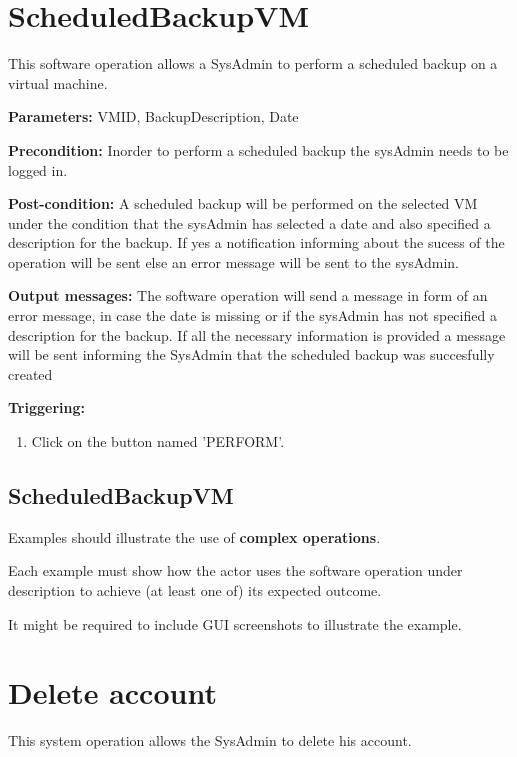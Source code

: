 \section{ScheduledBackupVM}
\label{operation:ScheduledBackupVM}
This software operation allows a SysAdmin to perform a scheduled backup on a
virtual machine.
\begin{description}

\item \textbf{Parameters:} VMID, BackupDescription, Date
\item \textbf{Precondition:} Inorder to perform a scheduled backup the sysAdmin 
needs to be logged in.
\item \textbf{Post-condition:} A scheduled backup will be performed on the
selected VM under the condition that the sysAdmin has selected a date and
also specified a description for the backup. If yes a notification informing
about the sucess of the operation will be sent else an error message will be
sent to the sysAdmin.
\item \textbf{Output messages:} The software operation will send a message in
form of an error message, in case the date is missing or if the sysAdmin has 
not specified a description for the backup. If all the necessary information
is provided a message will be sent informing the SysAdmin that the scheduled 
backup was succesfully created


\item \textbf{Triggering:}
\begin{enumerate}
\item Click on the button named 'PERFORM'.
\end{enumerate}

 
\end{description}


\subsection{ScheduledBackupVM}
Examples should illustrate the use of \textbf{complex operations}.

Each example must show how the actor uses the software operation under
description to achieve (at least one of) its expected outcome.

It might be required to include GUI screenshots to illustrate the example.



\section{Delete account}
\label{operation:ConfirmDelete}
This system operation allows the SysAdmin to delete his account.

